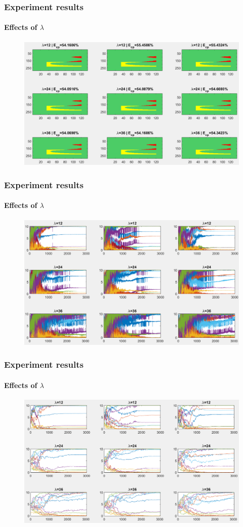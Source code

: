\documentclass[fleqn]{beamer}
\begin{document}
\begin{frame}
	\frametitle{Experiment results}
	\framesubtitle{Effects of $\lambda$}
	\begin{figure}
		\centering
		\includegraphics[width=4.5in]{figures/results_figures/lambda/cp_lambda_all.png}
	\end{figure}
\end{frame}

\begin{frame}
	\frametitle{Experiment results}
	\framesubtitle{Effects of $\lambda$}
	\begin{figure}
		\centering
		\includegraphics[width=4.5in]{figures/results_figures/lambda/knobs_lambda_all.png}
	\end{figure}
\end{frame}

\begin{frame}
	\frametitle{Experiment results}
	\framesubtitle{Effects of $\lambda$}
	\begin{figure}
		\centering
		\includegraphics[width=4.5in]{figures/results_figures/lambda/knobs_lambda_all_genmean.png}
	\end{figure}
\end{frame}
\end{document}
